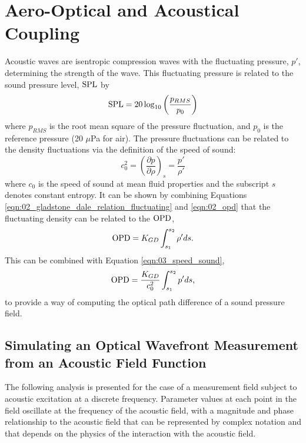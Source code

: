 
\chapter{Aero-Optical and Acoustical Coupling}
\label{chap:03_optical_acoustics}

Acoustic waves are isentropic compression waves with the fluctuating pressure, $p'$, determining the strength of the wave.
This fluctuating pressure is related to the sound pressure level, $\operatorname{SPL}$ by
\begin{equation}
  \operatorname{SPL} = 20\log_{10}\left(\frac{p_{RMS}}{p_0}\right)
  \label{eqn:03_spl}
\end{equation}
where $p_{RMS}$ is the root mean square of the pressure fluctuation, and $p_0$ is the reference pressure (20 $\mu$Pa for air).
The pressure fluctuations can be related to the density fluctuations via the definition of the speed of sound:
\begin{equation}
  c_0^2 = \left(\frac{\partial p}{\partial \rho}\right)_s=\frac{p'}{\rho'}
  \label{eqn:03_speed_sound}
\end{equation}
where $c_0$ is the speed of sound at mean fluid properties and the subscript $s$ denotes constant entropy.
It can be shown by combining Equations \ref{eqn:02_gladstone_dale_relation_fluctuating} and \ref{eqn:02_opd} that the fluctuating density can be related to the $\operatorname{OPD}$,
\begin{equation}
  \operatorname{OPD} = K_{GD}\int_{s_1}^{s_2}{\rho'}ds \textrm{.}
  \label{eqn:03_opd_fluct}
\end{equation}
This can be combined with Equation \ref{eqn:03_speed_sound},
\begin{equation}
  \operatorname{OPD} = \frac{K_{GD}}{c_0^2}\int_{s_1}^{s_2}{p'}ds \textrm{,}
  \label{eqn:03_opd_pressure}
\end{equation}
to provide a way of computing the optical path difference of a sound pressure field.

\section{Simulating an Optical Wavefront Measurement from an Acoustic Field Function}
\label{sect:03_simulated_beam}
The following analysis is presented for the case of a measurement field subject to acoustic excitation at a discrete frequency. Parameter values at each point in the field oscillate at the frequency of the acoustic field, with a magnitude and phase relationship to the acoustic field that can be represented by complex notation and that depends on the physics of the interaction with the acoustic field.

